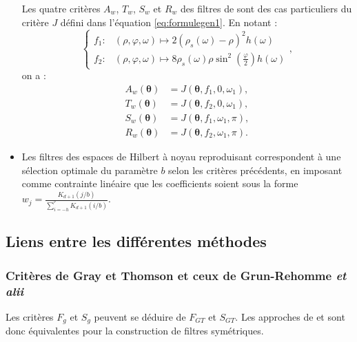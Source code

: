 \documentclass[
  12pt,
  a4paper,french]{article}
\newcommand\1{\mathds{1}}
\begin{document}
\begin{itemize}
  Les quatre critères \(A_w\), \(T_w\), \(S_w\) et \(R_w\) des filtres de \textcite{trilemmaWMR2019} sont des cas particuliers du critère \(J\) défini dans l'équation \eqref{eq:formulegen1}.
  En notant :
  \[
  \begin{cases}
    f_1\colon&(\rho,\varphi, \omega)\mapsto2\left(\rho_s(\omega)-\rho\right)^{2}h(\omega) \\
    f_2\colon&(\rho,\varphi, \omega)\mapsto8\rho_s(\omega)\rho\sin^{2}\left(\frac{\varphi}{2}\right)h(\omega)
  \end{cases},
  \]
  on a :
  \begin{align*}
  A_w(\boldsymbol\theta)&= J(\boldsymbol\theta,f_1,0,\omega_1),\\
  T_w(\boldsymbol\theta)&= J(\boldsymbol\theta,f_2,0,\omega_1),\\
  S_w(\boldsymbol\theta)&= J(\boldsymbol\theta,f_1,\omega_1,\pi),\\
  R_w(\boldsymbol\theta)&= J(\boldsymbol\theta,f_2,\omega_1,\pi).
  \end{align*}
\item
  Les filtres des espaces de Hilbert à noyau reproduisant correspondent à une sélection optimale du paramètre \(b\) selon les critères précédents, en imposant comme contrainte linéaire que les coefficients soient sous la forme \(w_j=\frac{K_{d+1}(j/b)}{\sum_{i=-h}^{^p}K_{d+1}(i/b)}\).
\end{itemize}

\hypertarget{liens-entre-les-diffuxe9rentes-muxe9thodes}{%
\subsection{Liens entre les différentes méthodes}\label{liens-entre-les-diffuxe9rentes-muxe9thodes}}

\hypertarget{crituxe8res-de-gray-et-thomson-et-ceux-de-grun-rehomme-et-alii}{%
\subsubsection{\texorpdfstring{Critères de Gray et Thomson et ceux de Grun-Rehomme \emph{et alii}}{Critères de Gray et Thomson et ceux de Grun-Rehomme et alii}}\label{crituxe8res-de-gray-et-thomson-et-ceux-de-grun-rehomme-et-alii}}

Les critères \(F_g\) et \(S_g\) peuvent se déduire de \(F_{GT}\) et \(S_{GT}\).
Les approches de \textcite{GrayThomson1996} et \textcite{ch15HBSA} sont donc équivalentes pour la construction de filtres symétriques.
\end{document}
